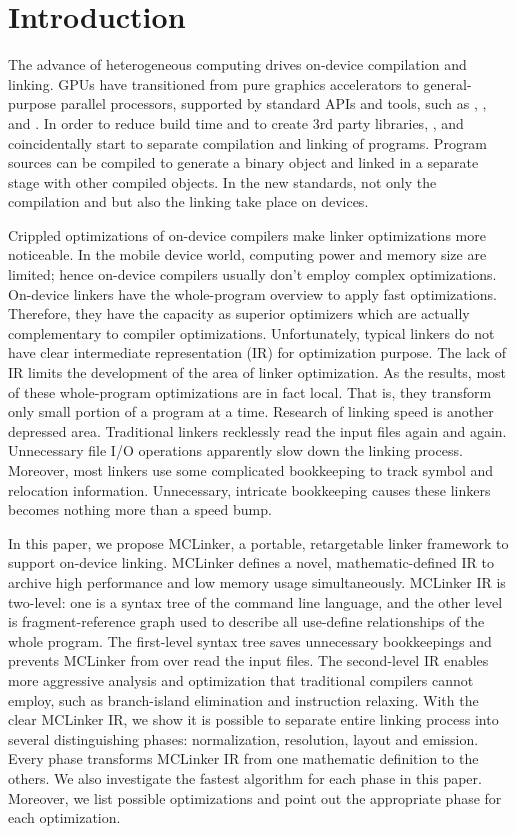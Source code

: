 \section{Introduction}
The advance of heterogeneous computing drives on-device compilation and linking. GPUs have transitioned from pure graphics accelerators to general-purpose parallel processors, supported by standard APIs and tools, such as \cite{CUDA}, \cite{OpenCL}, \cite{DirectCompute} and \cite{HSA}. In order to reduce build time and to create 3rd party libraries, \cite{CUDA}, \cite{OpenCL} and \cite{HSA} coincidentally start to separate compilation and linking of programs. Program sources can be compiled to generate a binary object and linked in a separate stage with other compiled objects. In the new standards, not only the compilation and but also the linking take place on devices.

Crippled optimizations of on-device compilers make linker optimizations more noticeable. In the mobile device world, computing power and memory size are limited; hence on-device compilers usually don't employ complex optimizations. On-device linkers have the whole-program overview to apply fast optimizations. Therefore, they have the capacity as superior optimizers which are actually complementary to compiler optimizations. Unfortunately, typical linkers do not have clear intermediate representation (IR) for optimization purpose. The lack of IR limits the development of the area of linker optimization. As the results, most of these whole-program optimizations are in fact local. That is, they transform only small portion of a program at a time. Research of linking speed is another depressed area. Traditional linkers recklessly read the input files again and again. Unnecessary file I/O operations apparently slow down the linking process. Moreover, most linkers use some complicated bookkeeping to track symbol and relocation information. Unnecessary, intricate bookkeeping causes these linkers becomes nothing more than a speed bump.

In this paper, we propose MCLinker, a portable, retargetable linker framework to support on-device linking. MCLinker defines a novel, mathematic-defined IR to archive high performance and low memory usage simultaneously. MCLinker IR is two-level: one is a syntax tree of the command line language, and the other level is fragment-reference graph used to describe all use-define relationships of the whole program. The first-level syntax tree saves unnecessary bookkeepings and prevents MCLinker from over read the input files. The second-level IR enables more aggressive analysis and optimization that traditional compilers cannot employ, such as branch-island elimination and instruction relaxing. With the clear MCLinker IR, we show it is possible to separate entire linking process into several distinguishing phases: normalization, resolution, layout and emission. Every phase transforms MCLinker IR from one mathematic definition to the others. We also investigate the fastest algorithm for each phase in this paper. Moreover, we list possible optimizations and point out the appropriate phase for each optimization.

